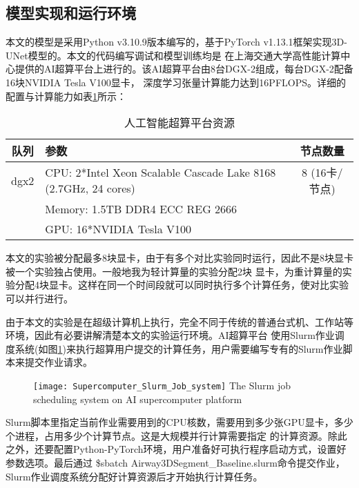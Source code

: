 \subsection{模型实现和运行环境}
本文的模型是采用Python v3.10.9版本编写的，基于PyTorch v1.13.1框架实现3D-UNet模型的。本文的代码编写调试和模型训练均是
在上海交通大学高性能计算中心提供的AI超算平台上进行的。该AI超算平台由8台DGX-2组成，每台DGX-2配备16块NVIDIA Tesla V100显卡，
深度学习张量计算能力达到16PFLOPS。详细的配置与计算能力如表\ref{tbl:AT_platform}所示：
\begin{table}[!htp]
    \caption{人工智能超算平台资源}
    \label{tbl:AT_platform}
    \centering
    \begin{tabular}{c|l|c}
        \toprule
        队列 & 参数 & 节点数量 \\
        \midrule
        dgx2 & CPU: 2*Intel Xeon Scalable Cascade Lake 8168 (2.7GHz, 24 cores) & 8 (16卡/节点) \\
             & Memory: 1.5TB DDR4 ECC REG 2666 & \\
             & GPU: 16*NVIDIA Tesla V100 & \\
        \bottomrule
    \end{tabular}
\end{table}
本文的实验被分配最多8块显卡，由于有多个对比实验同时运行，因此不是8块显卡被一个实验独占使用。一般地我为轻计算量的实验分配2块
显卡，为重计算量的实验分配4块显卡。这样在同一个时间段就可以同时执行多个计算任务，使对比实验可以并行进行。

由于本文的实验是在超级计算机上执行，完全不同于传统的普通台式机、工作站等环境，因此有必要讲解清楚本文的实验运行环境。AI超算平台
使用Slurm作业调度系统(如图\ref{fig:slurm_job_system})来执行超算用户提交的计算任务，用户需要编写专有的Slurm作业脚本来提交作业请求。
\begin{figure}[!htp]
    \centering
    \texttt{[image: Supercomputer\_Slurm\_Job\_system]}
        {The Slurm job scheduling system on AI supercomputer platform}
    \label{fig:slurm_job_system}
\end{figure}
Slurm脚本里指定当前作业需要用到的CPU核数，需要用到多少张GPU显卡，多少个进程，占用多少个计算节点。这是大规模并行计算需要指定
的计算资源。除此之外，还要配置Python-PyTorch环境，用户准备好可执行程序启动方式，设置好参数选项。最后通过 
\$sbatch Airway3DSegment\_Baseline.slurm命令提交作业，Slurm作业调度系统分配好计算资源后才开始执行计算任务。


